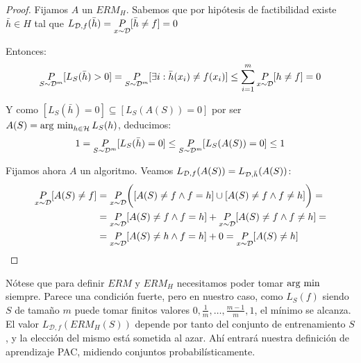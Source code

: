 \begin{proof}
Fijamos $A$ un $ERM_H$. Sabemos que por hipótesis de factibilidad existe $\bar{h} \in H$ tal que
$L_{\mathcal{D},f}(\bar{h}) = \underset{x\sim \mathcal{D}}{P}[\bar{h}\neq f] = 0$

Entonces: \[\underset{S\sim \mathcal{D}^m}{P}[L_S(\bar{h}) > 0] = \underset{S\sim \mathcal{D}^m}{P}
[\exists i: \bar{h}(x_i) \neq f(x_i)] \le \sum_{i=1}^m \underset{x\sim \mathcal{D}}{P}[h\neq f] = 0\]

Y como $[L_S(\bar{h}) = 0] \subseteq [L_S(A(S)) = 0]$ por ser $A(S) = \operatorname*{arg\,\min}_{h\in \mathcal{H}} L_S(h)$, deducimos:
\[1 = \underset{S\sim \mathcal{D}^m}{P}[L_S(\bar{h}) = 0] \le \underset{S\sim \mathcal{D}^m}{P}[L_S(A(S)) = 0] \le 1\]

Fijamos ahora $A$ un algoritmo. Veamos $L_{\mathcal{D},f}(A(S)) = L_{\mathcal{D},\bar{h}}(A(S))$:
  \begin{align*}
  \underset{x\sim \mathcal{D}}{P}[A(S) \neq f] &= \underset{x\sim \mathcal{D}}{P}\bigg([A(S) \neq f \wedge f=h] \cup[A(S) \neq f \wedge f\neq h]\bigg) = \\
  &= \underset{x\sim \mathcal{D}}{P}[A(S) \neq f \wedge f=h] + \underset{x\sim \mathcal{D}}{P}[A(S) \neq f \wedge f\neq h] = \\
  &= \underset{x\sim \mathcal{D}}{P}[A(S) \neq h \wedge f=h] + 0 = \underset{x\sim \mathcal{D}}{P}[A(S)\neq h]
  \end{align*}
\end{proof}

Nótese que para definir $ERM$ y $ERM_H$ necesitamos poder tomar $\operatorname*{arg\,\min}$ siempre. Parece una condición fuerte,
pero en nuestro caso, como $L_{S}(f)$ siendo $S$ de tamaño $m$ puede tomar finitos valores $0, \frac{1}{m}, \ldots, \frac{m-1}{m},1$,
el mínimo se alcanza. El valor $L_{\mathcal{D},f}(ERM_H(S))$ depende por tanto del conjunto de entrenamiento $S$, y la elección del
mismo está sometida al azar. Ahí entrará nuestra definición de aprendizaje PAC, midiendo conjuntos probabilísticamente.